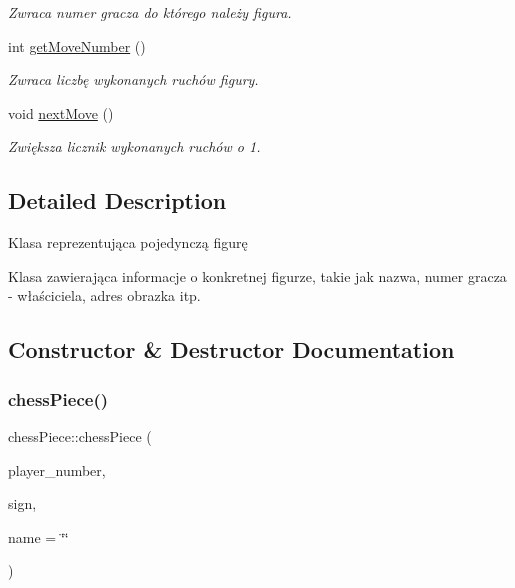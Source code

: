 \begin{DoxyCompactItemize}
\begin{DoxyCompactList}\small\item\em Zwraca numer gracza do którego należy figura. \end{DoxyCompactList}\item 
\mbox{\label{classchess_piece_a496f4a51efbb1287138d3dd94bf2cbdf}} 
int \hyperlink{classchess_piece_a496f4a51efbb1287138d3dd94bf2cbdf}{get\+Move\+Number} ()
\begin{DoxyCompactList}\small\item\em Zwraca liczbę wykonanych ruchów figury. \end{DoxyCompactList}\item 
\mbox{\label{classchess_piece_ab72882d27eb8f5ce67f0a7eff059e3ff}} 
void \hyperlink{classchess_piece_ab72882d27eb8f5ce67f0a7eff059e3ff}{next\+Move} ()
\begin{DoxyCompactList}\small\item\em Zwiększa licznik wykonanych ruchów o 1. \end{DoxyCompactList}\end{DoxyCompactItemize}


\subsection{Detailed Description}
Klasa reprezentująca pojedynczą figurę 

Klasa zawierająca informacje o konkretnej figurze, takie jak nazwa, numer gracza -\/ właściciela, adres obrazka itp. 

\subsection{Constructor \& Destructor Documentation}
\mbox{\label{classchess_piece_a2045dacd528cc380a1776d851b4583c8}} 
\subsubsection{\texorpdfstring{chess\+Piece()}{chessPiece()}}
{\footnotesize\ttfamily chess\+Piece\+::chess\+Piece (\begin{DoxyParamCaption}\item[{int}]{player\+\_\+number,  }\item[{char}]{sign,  }\item[{Q\+String}]{name = {\ttfamily \char`\"{}\char`\"{}} }\end{DoxyParamCaption})}



